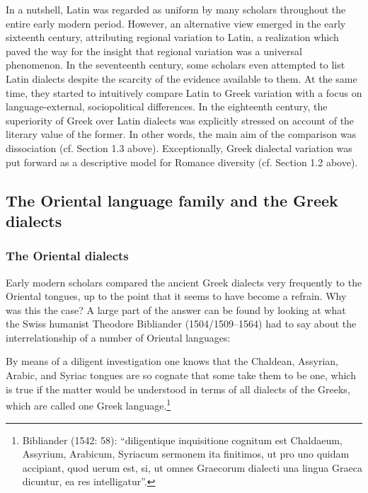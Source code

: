 \begin{styleStandard}
In a nutshell, Latin was regarded as uniform by many scholars throughout the entire early modern period. However, an alternative view emerged in the early sixteenth century, attributing regional variation to Latin, a realization which paved the way for the insight that regional variation was a universal phenomenon. In the seventeenth century, some scholars even attempted to list Latin dialects despite the scarcity of the evidence available to them. At the same time, they started to intuitively compare Latin to Greek variation with a focus on language-external, sociopolitical differences. In the eighteenth century, the superiority of Greek over Latin dialects was explicitly stressed on account of the literary value of the former. In other words, the main aim of the comparison was dissociation (cf. Section 1.3 above). Exceptionally, Greek dialectal variation was put forward as a descriptive model for Romance diversity (cf. Section 1.2 above).
\end{styleStandard}

\subsection{The Oriental language family and the Greek dialects}
\hypertarget{Toc19704864}{}\subsubsection{The Oriental dialects}
\hypertarget{Toc19704865}{}\begin{styleStandard}
Early modern scholars compared the ancient Greek dialects very frequently to the Oriental tongues, up to the point that it seems to have become a refrain. Why was this the case? A large part of the answer can be found by looking at what the Swiss humanist Theodore Bibliander (1504/1509–1564) had to say about the interrelationship of a number of Oriental languages:
\end{styleStandard}

\begin{styleQuote}
By means of a diligent investigation one knows that the Chaldean, Assyrian, Arabic, and Syriac tongues are so cognate that some take them to be one, which is true if the matter would be understood in terms of all dialects of the Greeks, which are called one Greek language.\footnote{ Bibliander (1542: 58): “diligentique inquisitione cognitum est Chaldaeum, Assyrium, Arabicum, Syriacum sermonem ita finitimos, ut pro uno quidam accipiant, quod uerum est, si, ut omnes Graecorum dialecti una lingua Graeca dicuntur, ea res intelligatur”.}
\end{styleQuote}

